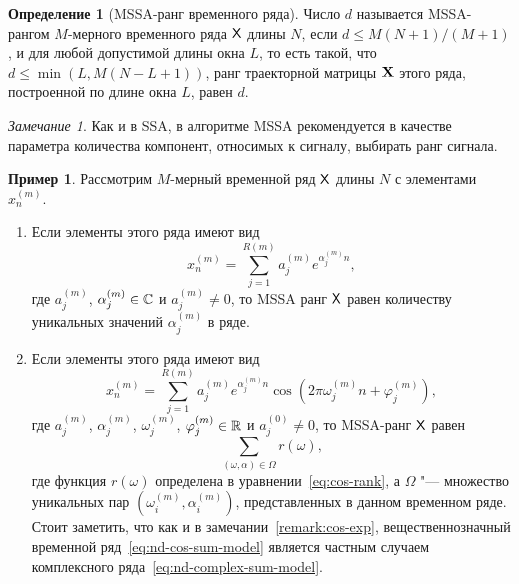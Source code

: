\documentclass[specialist,
  substylefile = spbu.rtx,
subf,href,colorlinks=true, 12pt]{disser}
\theoremstyle{plain}
\theoremstyle{definition}
\newtheorem{definition}{Определение}[section]
\newtheorem{example}{Пример}[section]
\theoremstyle{remark}
\newtheorem{remark}{Замечание}[section]
\begin{document}
\begin{definition}[MSSA-ранг временного ряда]
  \label{def:mssa-rank}
  Число $d$ называется MSSA-рангом $M$-мерного временного ряда $\mathsf{X}$
  длины $N$, если $d \leqslant M(N+1) / (M+1)$,
  и для любой допустимой
  длины окна $L$,
  то есть такой, что $d \leqslant \min(L, M(N- L + 1))$, ранг
  траекторной матрицы $\mathbf{X}$ этого ряда,
  построенной по длине окна $L$, равен $d$.
\end{definition}
\begin{remark}
  Как и в SSA, в алгоритме MSSA рекомендуется в качестве параметра
  количества компонент, относимых к сигналу,
  выбирать ранг сигнала.
\end{remark}
\begin{example}
  \label{ex:mssa-ranks}
  Рассмотрим $M$-мерный временной ряд $\mathsf{X}$ длины $N$ с элементами
  $x_n^{(m)}$.
  \begin{enumerate}
    \item\label{enum:mssa-ranks-complex} Если элементы этого ряда имеют вид
      \begin{equation}
        \label{eq:nd-complex-sum-model}
        x_n^{(m)} = \sum_{j=1}^{R(m)} a_j^{(m)} e^{\alpha_j^{(m)} n},
      \end{equation}
      где $a_j^{(m)}$, $\alpha_j^{(m)} \in \mathbb{C}$ и $a_j^{(m)} \ne 0$,
      то MSSA ранг $\mathsf{X}$ равен количеству уникальных значений $\alpha_j^{(m)}$
      в ряде.
    \item\label{enum:mssa-ranks-real} Если элементы этого ряда имеют вид
      \begin{equation}
        \label{eq:nd-cos-sum-model}
        x_n^{(m)} = \sum_{j=1}^{R(m)} a_j^{(m)} e^{\alpha_j^{(m)} n}
        \cos\left(2 \pi \omega_j^{(m)} n + \varphi_j^{(m)}\right),
      \end{equation}
      где $a_j^{(m)}$, $\alpha_j^{(m)}$, $\omega_j^{(m)}$,
      $\varphi_j^{(m)} \in \mathbb{R}$ и $a_j^{(0)} \ne 0$,
      то MSSA-ранг $\mathsf{X}$ равен
      \begin{equation*}
        \sum_{(\omega, \alpha)\in \Omega} r(\omega),
      \end{equation*}
      где функция $r(\omega)$ определена в уравнении~\eqref{eq:cos-rank},
      а $\Omega$ "--- множество уникальных пар
      \linebreak $\left(\omega_i^{(m)}, \alpha_i^{(m)}\right)$,
      представленных в данном временном ряде.
      Стоит заметить, что как и в замечании~\ref{remark:cos-exp},
      вещественнозначный временной ряд~\eqref{eq:nd-cos-sum-model}
      является частным случаем комплексного
      ряда~\eqref{eq:nd-complex-sum-model}.
  \end{enumerate}
\end{example}
\end{document}
